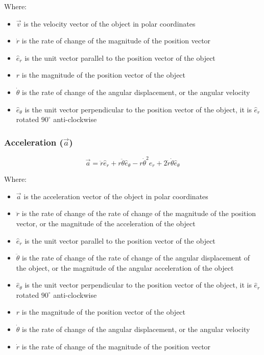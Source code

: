 \documentclass[11pt]{article}
\begin{document}
Where:
\begin{itemize}
\item \(\vec{v}\) is the velocity vector of the object in polar coordinates
\item \(\dot{r}\) is the rate of change of the magnitude of the position vector
\item \(\hat{e}_r\) is the unit vector parallel to the position vector of the object
\item \(r\) is the magnitude of the position vector of the object
\item \(\dot{\theta}\) is the rate of change of the angular displacement, or the angular velocity
\item \(\hat{e}_{\theta}\) is the unit vector perpendicular to the position vector of the object, it is \(\hat{e}_r\) rotated \(90^{\circ}\) anti-clockwise
\end{itemize}
\subsubsection{Acceleration (\(\vec{a}\))}
\label{sec:orgd2f9230}
\label{org92f4623}
\[\vec{a} = \ddot{r} \hat{e}_r + r \ddot{\theta} \hat{e}_{\theta} - r \dot{\theta}^2 \hat{e}_r + 2 \dot{r} \dot{\theta} \hat{e}_{\theta}\]

Where:
\begin{itemize}
\item \(\vec{a}\) is the acceleration vector of the object in polar coordinates
\item \(\ddot{r}\) is the rate of change of the rate of change of the magnitude of the position vector, or the magnitude of the acceleration of the object
\item \(\hat{e}_r\) is the unit vector parallel to the position vector of the object
\item \(\ddot{\theta}\) is the rate of change of the rate of change of the angular displacement of the object, or the magnitude of the angular acceleration of the object
\item \(\hat{e}_{\theta}\) is the unit vector perpendicular to the position vector of the object, it is \(\hat{e}_r\) rotated \(90^{\circ}\) anti-clockwise
\item \(r\) is the magnitude of the position vector of the object
\item \(\dot{\theta}\) is the rate of change of the angular displacement, or the angular velocity
\item \(\dot{r}\) is the rate of change of the magnitude of the position vector
\end{itemize}
\end{document}
